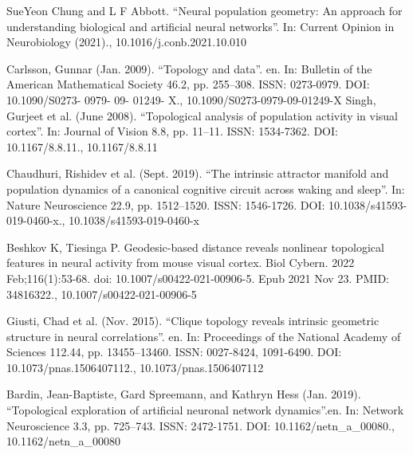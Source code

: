 \documentclass[9pt,conference]{IEEEtran}
\begin{document}
%
%
%
\begin{thebibliography}{1}

SueYeon Chung and L F Abbott. “Neural population geometry: An approach for understanding biological and artificial neural networks”. In: Current Opinion in Neurobiology (2021)., 10.1016/j.conb.2021.10.010

Carlsson, Gunnar (Jan. 2009). “Topology and data”. en. In: Bulletin of the American Mathematical Society 46.2, pp. 255–308. ISSN: 0273-0979. DOI: 10.1090/S0273- 0979- 09- 01249- X., 10.1090/S0273-0979-09-01249-X
Singh, Gurjeet et al. (June 2008). “Topological analysis of population activity in visual cortex”. In: Journal of Vision 8.8, pp. 11–11. ISSN: 1534-7362. DOI: 10.1167/8.8.11., 10.1167/8.8.11

Chaudhuri, Rishidev et al. (Sept. 2019). “The intrinsic attractor manifold and population dynamics of a canonical cognitive circuit across waking and sleep”. In: Nature Neuroscience 22.9, pp. 1512–1520. ISSN: 1546-1726. DOI: 10.1038/s41593-019-0460-x., 10.1038/s41593-019-0460-x

Beshkov K, Tiesinga P. Geodesic-based distance reveals nonlinear topological features in neural activity from mouse visual cortex. Biol Cybern. 2022 Feb;116(1):53-68. doi: 10.1007/s00422-021-00906-5. Epub 2021 Nov 23. PMID: 34816322., 10.1007/s00422-021-00906-5

Giusti, Chad et al. (Nov. 2015). “Clique topology reveals intrinsic geometric structure in neural correlations”. en. In: Proceedings of the National Academy of Sciences 112.44, pp. 13455–13460. ISSN: 0027-8424, 1091-6490. DOI: 10.1073/pnas.1506407112., 10.1073/pnas.1506407112

Bardin, Jean-Baptiste, Gard Spreemann, and Kathryn Hess (Jan. 2019). “Topological exploration of artificial neuronal network dynamics”.en. In: Network Neuroscience 3.3, pp. 725–743. ISSN: 2472-1751. DOI: 10.1162/netn\_a\_00080., 10.1162/netn\_a\_00080


\end{thebibliography}
\end{document}
